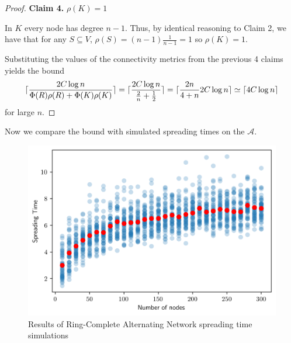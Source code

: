 \begin{proof}
\textbf{Claim 4.}  $\rho(K)=1$

In $K$ every node has degree $n - 1$. Thus, by identical reasoning to Claim 2, we have that for any $S \subseteq V$, $\rho(S) = (n-1)\frac{1}{n-1} = 1$ so $\rho(K) = 1$.

Substituting the values of the connectivity metrics from the previous 4 claims yields the bound
$$ %
	\ceil{\frac{2C \log n}{\Phi(R)\rho(R) + \Phi(K)\rho(K)}} = \ceil{\frac{2C \log n}{\frac{2}{n} + \frac{1}{2}}}
	= \ceil{\frac{2n}{4+n} 2C\log n}
	\simeq \ceil{4C \log n}
$$
for large $n$.

\end{proof}



Now we compare the bound with simulated spreading times on the $\mathcal{A}$.

\begin{figure}[h]
	\centering
	\includegraphics[width=1\textwidth]{./figures/alternating_ring_simulation_results.png}
	\caption{Results of Ring-Complete Alternating Network spreading time simulations}
	\label{fig:alternatingSimResults}
\end{figure}

